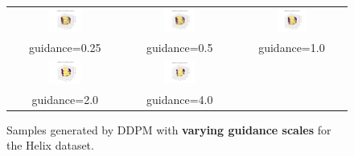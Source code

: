 \documentclass[11pt]{article}
\begin{document}
\begin{figure}[H]
    \centering
    \begin{tabular}{ccc}
        \includegraphics[width=0.3\textwidth]{exps/ddpm_3_150_0.0001_0.02_helix/samples_cfg_150_0.25.png} &
        \includegraphics[width=0.3\textwidth]{exps/ddpm_3_150_0.0001_0.02_helix/samples_cfg_150_0.5.png} &
        \includegraphics[width=0.3\textwidth]{exps/ddpm_3_150_0.0001_0.02_helix/samples_cfg_150_1.0.png} \\
        guidance=0.25 & guidance=0.5 & guidance=1.0 \\ [0.5em]
        
        \includegraphics[width=0.3\textwidth]{exps/ddpm_3_150_0.0001_0.02_helix/samples_cfg_150_2.0.png} &
        \includegraphics[width=0.3\textwidth]{exps/ddpm_3_150_0.0001_0.02_helix/samples_cfg_150_4.0.png} & \\
        guidance=2.0 & guidance=4.0 & \\
    \end{tabular}
    \caption{Samples generated by DDPM with \textbf{varying guidance scales} for the Helix dataset.}
    \label{fig:guidance_helix}
\end{figure}
\end{document}

